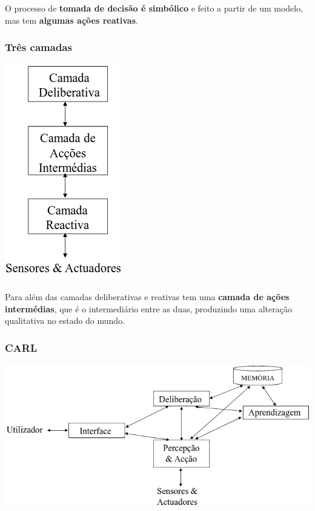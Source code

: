 \documentclass{article}
\begin{document}
O processo de \textbf{tomada de decisão é simbólico} e feito a partir de um modelo,
mas tem \textbf{algumas ações reativas}.

\pagebreak

\subsubsection{Três camadas}

\begin{center}
  \includegraphics[scale=0.35]{19}
\end{center}

Para além das camadas deliberativas e reativas tem uma \textbf{camada de ações intermédias},
que é o intermediário entre as duas, produzindo uma alteração qualitativa no estado do
mundo.

\subsubsection{CARL}

\begin{center}
  \includegraphics[scale=0.35]{20}
\end{center}
\end{document}

